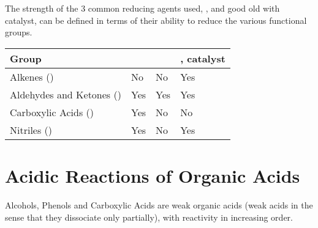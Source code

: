 		The strength of the 3 common reducing agents used, ,  and good old  with 
		catalyst, can be defined in terms of their ability to reduce the various functional groups.

		\begin{center}\begin{table}[htb]\renewcommand{\arraystretch}{1.5}
		\begin{tabu} to \textwidth {| X[c,m] | X[c,m] | X[c,m] | X[c,m] |}

			\hline
						Group						&		&		&	,  catalyst	\\	\hline
\vspace{2mm}		Alkenes ()				\vspace{2mm}&			No			&		No		&				Yes				\\	\hline
\vspace{2mm}	Aldehydes and Ketones ()	\vspace{2mm}&			Yes			&		Yes		&				Yes				\\	\hline
\vspace{2mm}	Carboxylic Acids ()		\vspace{2mm}&			Yes			&		No		&				No				\\	\hline
\vspace{2mm}		Nitriles ()				\vspace{2mm}&			Yes			&		No		&				Yes				\\	\hline

		\end{tabu}
		\end{table}\end{center}\vspace{-10mm}




	\pagebreak
	\section{Acidic Reactions of Organic Acids}

		Alcohols, Phenols and Carboxylic Acids are weak organic acids (weak acids in the sense that they dissociate only partially), with
		reactivity in increasing order.

